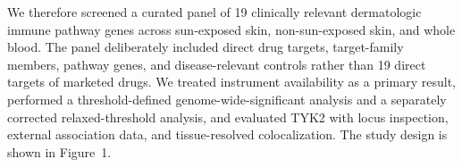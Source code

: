 We therefore screened a curated panel of 19 clinically relevant dermatologic immune pathway genes across sun-exposed skin, non-sun-exposed skin, and whole blood. The panel deliberately included direct drug targets, target-family members, pathway genes, and disease-relevant controls rather than 19 direct targets of marketed drugs. We treated instrument availability as a primary result, performed a threshold-defined genome-wide-significant analysis and a separately corrected relaxed-threshold analysis, and evaluated TYK2 with locus inspection, external association data, and tissue-resolved colocalization. The study design is shown in Figure~1.
